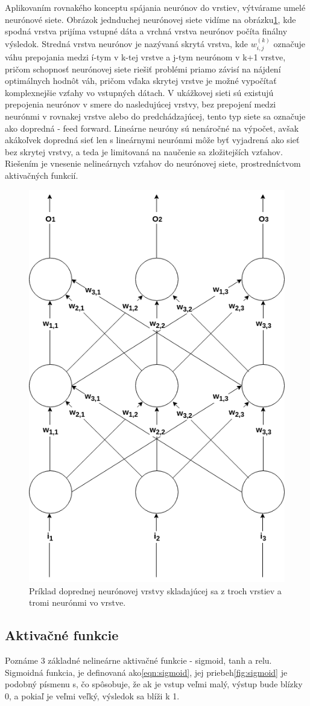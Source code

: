 \indent Aplikovaním rovnakého konceptu spájania neurónov do vrstiev, výtvárame umelé neurónové siete.
Obrázok jednduchej neurónovej siete vidíme na obrázku\ref{fig:ann}, kde spodná vrstva prijíma vstupné dáta a vrchná vrstva neurónov počíta finálny výsledok.
Stredná vrstva neurónov je nazývaná skrytá vrstva, kde $w_{i, j}^{(k)}$ označuje váhu prepojania medzi í-tym v k-tej vrstve a j-tym neurónom v k+1 vrstve, pričom schopnosť neurónovej siete riešiť problémi 
priamo závisí na nájdení optimálnych hodnôt váh, pričom vďaka skrytej vrstve je možné vypočítať komplexnejšie vzťahy vo vstupných dátach.
V ukážkovej sieti sú existujú prepojenia neurónov v smere do nasledujúcej vrstvy, bez prepojení medzi neurónmi v rovnakej vrstve alebo do predchádzajúcej, tento typ siete sa označuje ako dopredná - feed forward.
Lineárne neuróny sú nenáročné na výpočet, avšak akákoľvek dopredná sieť len s lineárnymi neurónmi môže byť vyjadrená ako sieť bez skrytej vrstvy, a teda je limitovaná na naučenie sa zložitejších vzťahov.
Riešením je vnesenie nelineárnych vzťahov do neurónovej siete, prostredníctvom aktivačných funkcií.\cite{buduma2017fundamentals}

\begin{figure}[H]
	\centering
	\includegraphics[width=0.5\linewidth]{img/ann}
	\caption{Príklad doprednej neurónovej vrstvy skladajúcej sa z troch vrstiev a tromi neurónmi vo vrstve.}
	\label{fig:ann}
\end{figure}

\subsection{Aktivačné funkcie}\label{activation}
Poznáme 3 základné nelineárne aktivačné funkcie - sigmoid, tanh a relu.
Sigmoidná funkcia, je definovaná ako\eqref{eqn:sigmoid}, jej priebeh\ref{fig:sigmoid} je podobný písmenu s, čo spôsobuje, že ak je vstup veľmi malý, výstup bude blízky 0, a pokiaľ je veľmi veľký, výsledok sa blíži k 1.


